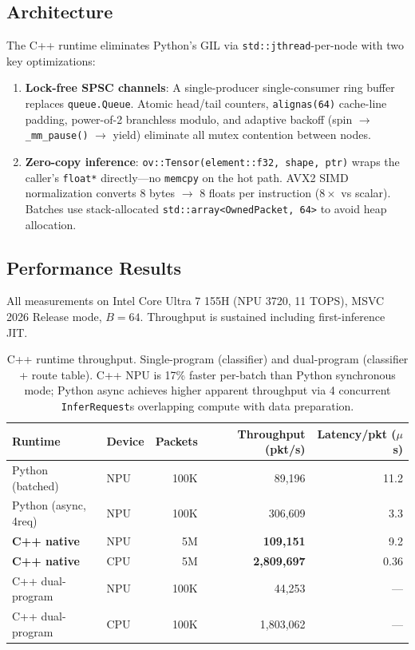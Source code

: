 \documentclass[11pt,a4paper,twoside]{article}
\theoremstyle{definition}
\theoremstyle{remark}
\begin{document}
\subsection{Architecture}

The C++ runtime eliminates Python's GIL via \texttt{std::jthread}-per-node with two key optimizations:

\begin{enumerate}[leftmargin=*]
  \item \textbf{Lock-free SPSC channels}: A single-producer single-consumer ring buffer replaces \texttt{queue.Queue}. Atomic head/tail counters, \texttt{alignas(64)} cache-line padding, power-of-2 branchless modulo, and adaptive backoff (spin $\to$ \texttt{\_mm\_pause()} $\to$ yield) eliminate all mutex contention between nodes.

  \item \textbf{Zero-copy inference}: \texttt{ov::Tensor(element::f32, shape, ptr)} wraps the caller's \texttt{float*} directly---no \texttt{memcpy} on the hot path. AVX2 SIMD normalization converts 8 bytes $\to$ 8 floats per instruction ($8\times$ vs scalar). Batches use stack-allocated \texttt{std::array<OwnedPacket, 64>} to avoid heap allocation.
\end{enumerate}

\subsection{Performance Results}

All measurements on Intel Core Ultra 7 155H (NPU 3720, 11 TOPS), MSVC 2026 Release mode, $B{=}64$. Throughput is sustained including first-inference JIT.

\begin{table}[H]
\centering
\small
\begin{tabular}{llrrr}
\toprule
\textbf{Runtime} & \textbf{Device} & \textbf{Packets} & \textbf{Throughput (pkt/s)} & \textbf{Latency/pkt ($\mu$s)} \\
\midrule
Python (batched)     & NPU & 100K  & 89{,}196   & 11.2 \\
Python (async, 4req) & NPU & 100K  & 306{,}609  & 3.3 \\
\textbf{C++ native}  & NPU & 5M    & \textbf{109{,}151} & 9.2 \\
\textbf{C++ native}  & CPU & 5M    & \textbf{2{,}809{,}697} & 0.36 \\
\midrule
C++ dual-program     & NPU & 100K  & 44{,}253 & --- \\
C++ dual-program     & CPU & 100K  & 1{,}803{,}062 & --- \\
\bottomrule
\end{tabular}
\caption{C++ runtime throughput. Single-program (classifier) and dual-program (classifier + route table). C++ NPU is 17\% faster per-batch than Python synchronous mode; Python async achieves higher apparent throughput via 4 concurrent \texttt{InferRequest}s overlapping compute with data preparation.}
\label{tab:cpp-single}
\end{table}
\end{document}

